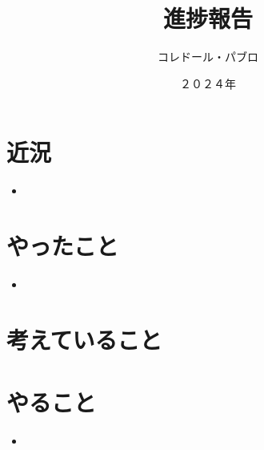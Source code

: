 \documentclass[a4paper, 12pt]{article}
\title{進捗報告}
\author{コレドール・パブロ}
\date{２０２４年}
\begin{document}
\maketitle

\section*{近況}
\begin{itemize}
    \item 
\end{itemize} 

\section*{やったこと}
\begin{itemize}
    \item 
\end{itemize}

\section*{考えていること}

\section*{やること}
\begin{itemize}
    \item 
\end{itemize}



\end{document}
